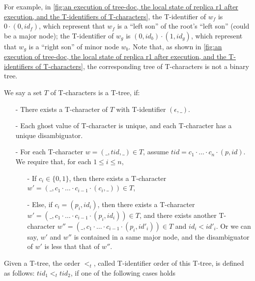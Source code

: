 For example, in \autoref{fig:an execution of tree-doc, the local state of replica r1 after execution, and the T-identifiers of T-characters}, the T-identifier of $w_f$ is $0 \cdot (0,id_f)$, which represent that $w_f$ is a ``left son'' of the root's ``left son'' (could be a major node); the T-identifier of $w_g$ is $(0,id_b) \cdot (1,id_g)$, which represent that $w_g$ is a ``right son'' of minor node $w_b$. Note that, as shown in \autoref{fig:an execution of tree-doc, the local state of replica r1 after execution, and the T-identifiers of T-characters}, the corresponding tree of T-characters is not a binary tree.

We say a set $T$ of T-characters is a T-tree, if:

\begin{itemize}
\setlength{\itemsep}{0.5pt}
\item[-] There exists a T-character of $T$ with T-identifier $(\epsilon,\_)$.

\item[-] Each ghost value of T-character is unique, and each T-character has a unique disambiguator.

\item[-] For each T-character $w=(\_,tid,\_) \in T$, assume $tid = c_1 \cdot \ldots \cdot c_n \cdot (p,id)$. We require that, for each $1 \leq i \leq n$,

    \begin{itemize}
    \setlength{\itemsep}{0.5pt}
    \item[-] If $c_i \in \{ 0,1 \}$, then there exists a T-character $w' = (\_, c_1 \cdot \ldots \cdot c_{i-1} \cdot (c_i,\_) ) \in T$,

    \item[-] Else, if $c_i = (p_i,id_i)$, then there exists a T-character $w' = (\_, c_1 \cdot \ldots \cdot c_{i-1} \cdot (p_i,id_i) ) \in T$, and there exists another T-character $w'' = (\_, c_1 \cdot \ldots \cdot c_{i-1} \cdot (p_i,id'_i) ) \in T$ and $id_i < id'_i$. Or we can say, $w'$ and $w''$ is contained in a same major node, and the disambiguator of $w'$ is less that that of $w''$.
    \end{itemize}
\end{itemize}

Given a T-tree, the order $<_t$, called T-identifier order of this T-tree, is defined as follows: $tid_1 <_t tid_2$, if one of the following cases holds

